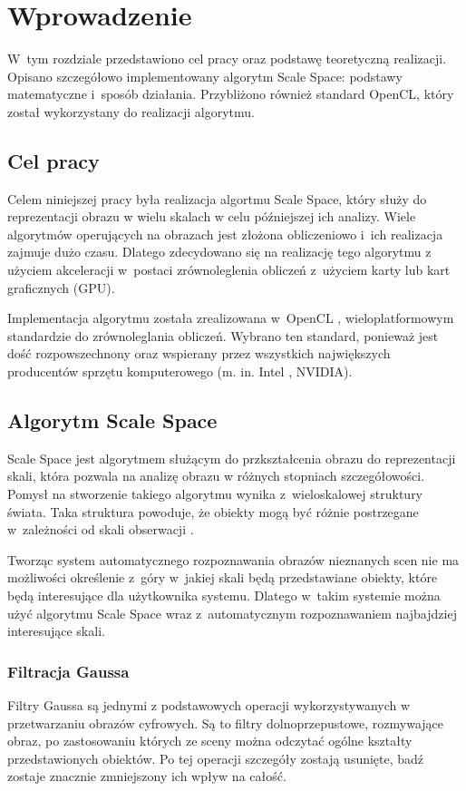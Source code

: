\chapter{Wprowadzenie}
\label{cha:wprowadzenie}

W~tym rozdziale przedstawiono cel pracy oraz podstawę teoretyczną realizacji. Opisano szczegółowo implementowany algorytm Scale Space: podstawy matematyczne i~sposób działania. Przybliżono również standard OpenCL, który został wykorzystany do realizacji algorytmu.


\section{Cel pracy}
\label{sec:cel}
Celem niniejszej pracy była realizacja algortmu Scale Space, który służy do reprezentacji obrazu w wielu skalach w celu późniejszej ich analizy. Wiele algorytmów operujących na obrazach jest złożona obliczeniowo i~ich realizacja zajmuje dużo czasu. Dlatego zdecydowano się na realizację tego algorytmu z użyciem akceleracji w~postaci zrównoleglenia obliczeń z~użyciem karty lub kart graficznych (GPU).

Implementacja algorytmu została zrealizowana w~OpenCL \cite{OpenCL}, wieloplatformowym standardzie do zrównoleglania obliczeń. Wybrano ten standard, ponieważ jest dość rozpowszechnony oraz wspierany przez wszystkich największych producentów sprzętu komputerowego (m. in. Intel\textsuperscript{\textregistered} , NVIDIA\textsuperscript{\texttrademark}).

\section{Algorytm Scale Space}
\label{sec:algorytm}
Scale Space jest algorytmem służącym do przkształcenia obrazu do reprezentacji skali, która pozwala na analizę obrazu w różnych stopniach szczegółowości. Pomysł na stworzenie takiego algorytmu wynika z~wieloskalowej struktury świata. Taka struktura powoduje, że obiekty mogą być różnie postrzegane w~zależności od skali obserwacji \cite{Enc09}.

Tworząc system automatycznego rozpoznawania obrazów nieznanych scen nie ma możliwości określenie z~góry w~jakiej skali będą przedstawiane obiekty, które będą interesujące dla użytkownika systemu. Dlatego w~takim systemie można użyć algorytmu Scale Space wraz z~automatycznym rozpoznawaniem najbajdziej interesujące skali.



\subsection{Filtracja Gaussa}
\label{subsec:filtracjaGaussa}
Filtry Gaussa są jednymi z podstawowych operacji wykorzystywanych w przetwarzaniu obrazów cyfrowych. Są to filtry dolnoprzepustowe, rozmywające obraz, po zastosowaniu których ze sceny można odczytać ogólne kształty przedstawionych obiektów. Po tej operacji szczegóły zostają usunięte, badź zostaje znacznie zmniejszony ich wpływ na całość.

